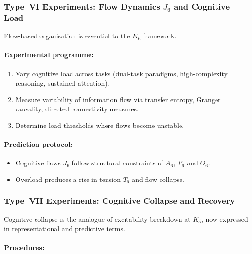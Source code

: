 \subsubsection{Type~VI Experiments: Flow Dynamics \texorpdfstring{$J_6$}{J_6} and Cognitive Load}

Flow-based organisation is essential to the $K_6$ framework.

\paragraph{Experimental programme:}

\begin{enumerate}
    \item Vary cognitive load across tasks (dual-task paradigms,
          high-complexity reasoning, sustained attention).
    \item Measure variability of information flow 
          via transfer entropy, Granger causality,
          directed connectivity measures.
    \item Determine load thresholds where flows become unstable.
\end{enumerate}

\paragraph{Prediction protocol:}

\begin{itemize}
    \item Cognitive flows $J_6$ follow structural constraints of $A_6$,
          $P_6$ and $\Theta_6$.
    \item Overload produces a rise in tension $T_6$ and 
          flow collapse.
\end{itemize}



\subsubsection{Type~VII Experiments: Cognitive Collapse and Recovery}

Cognitive collapse is the analogue of excitability breakdown at $K_5$,
now expressed in representational and predictive terms.

\paragraph{Procedures:}

